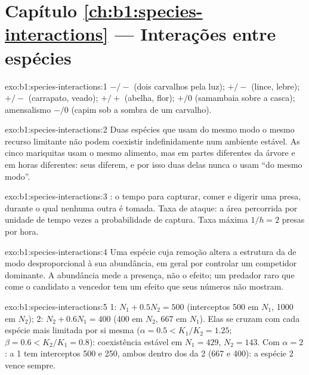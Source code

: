 \section*{Capítulo \ref{ch:b1:species-interactions} --- Interações entre espécies}

\begin{solution}{exo:b1:species-interactions:1}
 $-/-$ (dois carvalhos pela luz);  $+/-$ (lince,
lebre);  $+/-$ (carrapato, veado);  $+/+$
(abelha, flor);  $+/0$ (samambaia sobre a casca);
amensalismo $-/0$ (capim sob a sombra de um carvalho).
\end{solution}

\begin{solution}{exo:b1:species-interactions:2}
Duas espécies que usam do mesmo modo o mesmo recurso limitante não
podem coexistir indefinidamente num ambiente estável. As cinco
mariquitas usam o mesmo alimento, mas em partes diferentes da árvore e
em horas diferentes: seus  diferem, e por isso duas delas nunca
o usam ``do mesmo modo''.
\end{solution}

\begin{solution}{exo:b1:species-interactions:3}
: o tempo para capturar, comer e digerir uma
presa, durante o qual nenhuma outra é tomada. Taxa de ataque: a área
percorrida por unidade de tempo vezes a probabilidade de captura. Taxa
máxima $1/h = 2$ presas por hora.
\end{solution}

\begin{solution}{exo:b1:species-interactions:4}
Uma espécie cuja remoção altera a estrutura da  de modo
desproporcional à sua abundância, em geral por controlar um competidor
dominante. A abundância mede a presença, não o efeito; um predador
raro que come o candidato a vencedor tem um efeito que seus números
não mostram.
\end{solution}

\begin{solution}{exo:b1:species-interactions:5}
 1: $N_1 + 0.5 N_2 = 500$ (interceptos 500 em $N_1$, 1000 em
$N_2$);  2: $N_2 + 0.6 N_1 = 400$ (400 em $N_2$, 667 em $N_1$).
Elas se cruzam com cada espécie mais limitada por si mesma ($\alpha = 0.5 <
K_1/K_2 = 1.25$; $\beta = 0.6 < K_2/K_1 = 0.8$): coexistência estável
em $N_1 = 429$, $N_2 = 143$. Com $\alpha = 2$: a  1 tem
interceptos 500 e 250, ambos dentro dos da  2 (667 e 400): a
espécie 2 vence sempre.
\end{solution}

